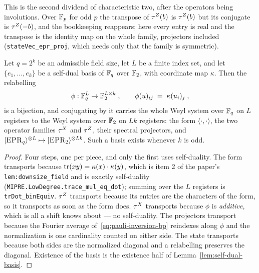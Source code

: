 This is the second dividend of characteristic two, after the operators being involutions. Over
$\mathbb{F}_p$ for odd $p$ the transpose of $\tau^Z(b)$ is $\tau^Z(b)$ but its conjugate is $\tau^Z(-b)$, and
the bookkeeping reappears; here every entry is real and the transpose is the identity map on the
whole family, projectors included (\texttt{stateVec\_epr\_proj}, which needs only that the family
is symmetric).

\effortEasy

\begin{lemma}
\label{lem:pauli-binary}
\leanok
Let $q = 2^k$ be an admissible field size, let $L$ be a finite index set, and let
$\{e_1, \ldots, e_k\}$ be a self-dual basis of $\mathbb{F}_q$ over $\mathbb{F}_2$, with coordinate map
$\kappa$. Then the relabelling
\begin{equation*}
  \phi : \mathbb{F}_q^L \to \mathbb{F}_2^{L \times k}\;, \qquad \phi(u)_{i j} \;=\; \kappa(u_i)_j\;,
\end{equation*}
is a bijection, and conjugating by it carries the whole Weyl system over $\mathbb{F}_q$ on $L$ registers
to the Weyl system over $\mathbb{F}_2$ on $L k$ registers: the form $\langle \cdot, \cdot \rangle$, the
two operator families $\tau^X$ and $\tau^Z$, their spectral projectors, and
$|\textsc{EPR}_q\rangle^{\otimes L} \mapsto |\textsc{EPR}_2\rangle^{\otimes L k}$. Such a basis exists whenever $k$ is odd.
\end{lemma}

\begin{proof}
\leanok
{}
Four steps, one per piece, and only the first uses self-duality. The form transports because
$\operatorname{tr}(x y) = \kappa(x) \cdot \kappa(y)$, which is item 2 of the paper's
\texttt{lem:downsize\_field} and is exactly self-duality
(\texttt{MIPRE.LowDegree.trace\_mul\_eq\_dot}); summing over the $L$ registers is
\texttt{trDot\_binEquiv}. $\tau^Z$ transports because its entries are the characters of the form,
so it transports as soon as the form does. $\tau^X$ transports because $\phi$ is
\emph{additive}, which is all a shift knows about --- no self-duality. The projectors transport
because the Fourier average of~\eqref{eq:pauli-inversion-bp} reindexes along $\phi$ and the
normalization is one cardinality counted on either side. The state transports because both sides
are the normalized diagonal and a relabelling preserves the diagonal. Existence of the basis is
the existence half of Lemma~\ref{lem:self-dual-basis}.
\end{proof}

